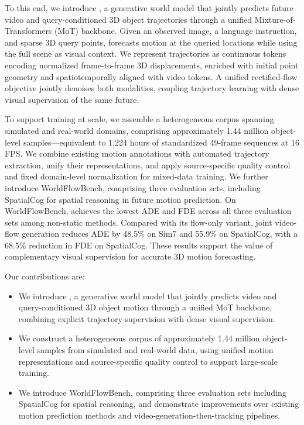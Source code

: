 To this end, we introduce \method{}, a generative world model
that jointly predicts future video and query-conditioned
3D object trajectories through a unified
Mixture-of-Transformers (MoT) backbone.
Given an observed image, a language instruction, and sparse
3D query points, \method{} forecasts motion at the queried
locations while using the full scene as visual context.
We represent trajectories as continuous tokens encoding
normalized frame-to-frame 3D displacements, enriched with
initial point geometry and spatiotemporally aligned with
video tokens.
A unified rectified-flow objective jointly denoises both
modalities, coupling trajectory learning with dense visual
supervision of the same future.

To support training at scale, we assemble a heterogeneous
corpus spanning simulated and real-world domains, comprising
approximately 1.44 million object-level samples---equivalent
to 1,224 hours of standardized 49-frame sequences at 16 FPS.
We combine existing motion annotations with automated
trajectory extraction, unify their representations, and
apply source-specific quality control and fixed domain-level
normalization for mixed-data training.
We further introduce WorldFlowBench, comprising three
evaluation sets, including SpatialCog for spatial reasoning
in future motion prediction.
On WorldFlowBench, \method{} achieves the lowest ADE and FDE
across all three evaluation sets among non-static methods.
Compared with its flow-only variant, joint video-flow
generation reduces ADE by 48.5\% on Sim7 and 55.9\% on
SpatialCog, with a 68.5\% reduction in FDE on SpatialCog.
These results support the value of complementary visual
supervision for accurate 3D motion forecasting.

Our contributions are:
\begin{itemize}
    \item We introduce \method{}, a generative world model
    that jointly predicts video and query-conditioned 3D
    object motion through a unified MoT backbone, combining
    explicit trajectory supervision with dense visual
    supervision.

    \item We construct a heterogeneous corpus of approximately
    1.44 million object-level samples from simulated and
    real-world data, using unified motion representations
    and source-specific quality control to support
    large-scale training.

    \item We introduce WorldFlowBench, comprising three
    evaluation sets including SpatialCog for spatial
    reasoning, and demonstrate improvements over existing
    motion prediction methods and
    video-generation-then-tracking pipelines.
\end{itemize}